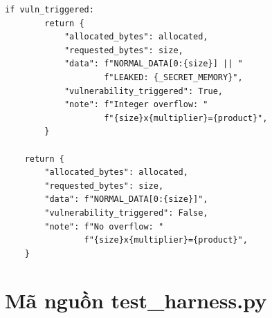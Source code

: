 \documentclass{nt521report}
\begin{document}
\begin{lstlisting}[style=Python, caption={vulnerable\_code.py -- Toàn bộ mã nguồn mô phỏng lỗ hổng}, basicstyle=\ttfamily\scriptsize]
    if vuln_triggered:
        return {
            "allocated_bytes": allocated,
            "requested_bytes": size,
            "data": f"NORMAL_DATA[0:{size}] || "
                    f"LEAKED: {_SECRET_MEMORY}",
            "vulnerability_triggered": True,
            "note": f"Integer overflow: "
                    f"{size}x{multiplier}={product}",
        }

    return {
        "allocated_bytes": allocated,
        "requested_bytes": size,
        "data": f"NORMAL_DATA[0:{size}]",
        "vulnerability_triggered": False,
        "note": f"No overflow: "
                f"{size}x{multiplier}={product}",
    }
\end{lstlisting}


\chapter{Mã nguồn test\_harness.py}
\label{app:harness-full}
\end{document}
